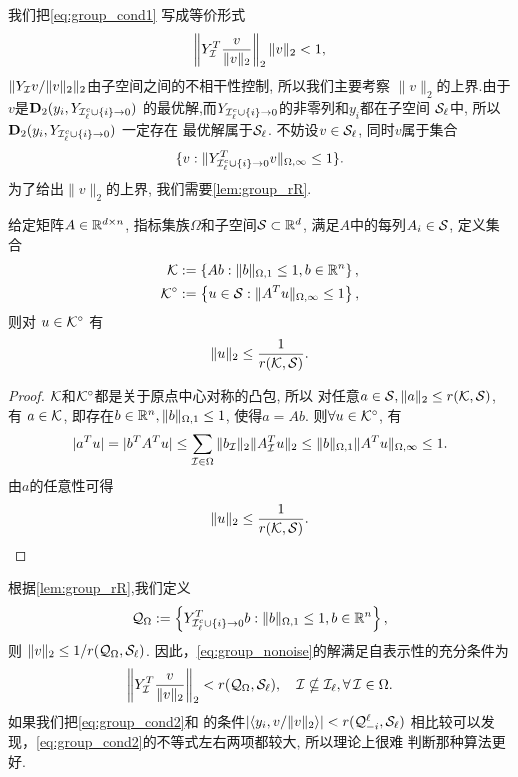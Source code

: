 我们把\eqref{eq:group_cond1} 写成等价形式
\begin{equation*}
  \left\|Y_{\mathcal{I}}^T \frac{v}{\|v\|_2}\right\|_2 \|v\|_2<1,
\end{equation*}
\(\|Y_{\mathcal{I}} v/\|v\|_2\|_2\)由子空间之间的不相干性控制, 所以我们主要考察
$\|v\|_2$的上界.由于$v$是$\mathbf{D}_2(y_i, Y_{\mathcal{I}_\ell^c\cup \{i\}\rightarrow 0})$
的最优解,而$Y_{\mathcal{I}_\ell^c\cup \{i\}\rightarrow 0}$的非零列和$y_i$都在子空间
$\mathcal{S}_\ell$中, 所以$\mathbf{D}_2(y_i, Y_{\mathcal{I}_\ell^c\cup \{i\}\rightarrow 0})$ 一定存在
最优解属于$\mathcal{S}_\ell$. 不妨设$v\in \mathcal{S}_\ell$, 同时$v$属于集合
$$\{ v: \|Y^T_{\mathcal{I}_\ell^c\cup \{i\}\rightarrow 0} v\|_{\Omega,\infty}\le
1\}.$$
为了给出$\|v\|_2$的上界, 我们需要\autoref{lem:group_rR}.
\begin{lemma}\label{lem:group_rR}
  给定矩阵$A\in \mathbb{R}^{d\times n}$, 指标集族$\Omega$和子空间$\mathcal{S}\subset \mathbb{R}^d$,
  满足$A$中的每列$A_i\in \mathcal{S}$, 定义集合
  \begin{align*}
    \mathcal{K} &:= \left\{ Ab: \|b\|_{\Omega, 1}\le 1, b\in \mathbb{R}^n \right\},\\
    \mathcal{K}^\circ &:= \left\{ u\in \mathcal{S} : \|A^Tu\|_{\Omega, \infty}\le 1 \right\},
  \end{align*}
  则对 $u\in \mathcal{K}^\circ$ 有
  $$ \|u\|_2 \le \frac{1}{r(\mathcal{K}, \mathcal{S})}.$$
\end{lemma}
\begin{proof}
  $\mathcal{K}$和$\mathcal{K}^\circ$都是关于原点中心对称的凸包, 所以
  对任意$a\in \mathcal{S}, \|a\|_2\le r(\mathcal{K}, \mathcal{S})$, 有 $a \in \mathcal{K}$,
  即存在$ b\in\mathbb{R}^n, \|b\|_{\Omega, 1}\le 1$, 使得$a=Ab$. 则$\forall u\in
  \mathcal{K}^\circ$,
  有
  \begin{equation*}
    |a^T u| = |b^T A^T u| \le \sum_{\mathcal{I}\in \Omega} \|b_{\mathcal{I}}\|_2 \|A^T_{\mathcal{I}} u\|_2
    \le \|b\|_{\Omega, 1}\|A^T u\|_{\Omega,\infty} \le 1.
  \end{equation*}
  由$a$的任意性可得
  $$ \|u\|_2 \le \frac{1}{r(\mathcal{K}, \mathcal{S})}.$$
\end{proof}
根据\autoref{lem:group_rR},我们定义
\begin{equation*}
  \mathcal{Q}_\Omega := \left\{ Y^T_{\mathcal{I}_\ell^c\cup \{i\}\rightarrow 0}b:
  \|b\|_{\Omega, 1}\le 1, b\in \mathbb{R}^n \right\},
\end{equation*}
则 $\|v\|_2 \le 1/r(\mathcal{Q}_\Omega, \mathcal{S}_\ell)$.
因此，\eqref{eq:group_nonoise}的解满足自表示性的充分条件为
\begin{equation} \label{eq:group_cond2}
  \left\|Y_{\mathcal{I}}^T \frac{v}{\|v\|_2}\right\|_2 < r(\mathcal{Q}_\Omega, \mathcal{S}_\ell), \quad
  \mathcal{I} \nsubseteq \mathcal{I}_\ell, \forall\, \mathcal{I} \in \Omega.
\end{equation}
如果我们把\eqref{eq:group_cond2}和\cite[定理~2.5]{soltanolkotabi2012geometric}
的条件$|\langle y_i, v/\|v\|_2\rangle|<r(\mathcal{Q}^\ell_{-i}, \mathcal{S}_\ell)$
相比较可以发现，\eqref{eq:group_cond2}的不等式左右两项都较大, 所以理论上很难
判断那种算法更好.
